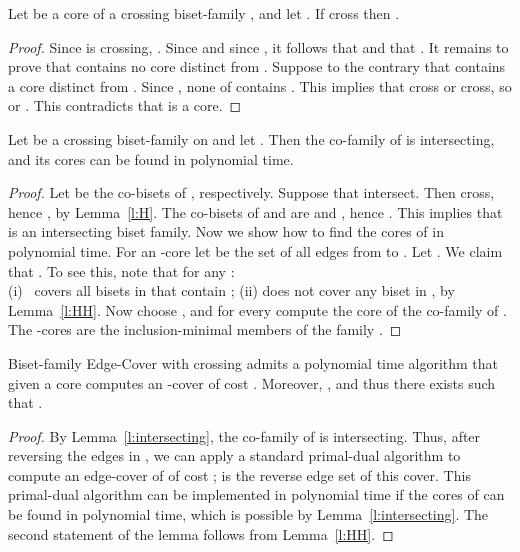 \begin{lemma} \label{l:H}
Let  be a core of a crossing biset-family , 
and let . 
If  cross then .
\end{lemma}
\begin{proof}
Since  is crossing, .
Since 
and since , it follows that 
and that .
It remains to prove that  contains no core distinct from .
Suppose to the contrary that  contains a core  distinct from .
Since , none of  contains .
This implies that  cross or  cross,
so  or .
This contradicts that  is a core.
\end{proof}

\begin{lemma} \label{l:intersecting}
Let  be a crossing biset-family on  and let .
Then the co-family 
of  is intersecting, and its cores can be found in polynomial time.
\end{lemma}
\begin{proof}
Let  be the co-bisets of ,
respectively. Suppose that  intersect.
Then  cross, hence ,
by Lemma~\ref{l:H}. The co-bisets of  and  are
 and ,
hence .
This implies that  is an intersecting biset family. 
Now we show how to find the cores of  in polynomial time.
For an -core  let 
 be the set of all edges 
from  to . 
Let . 
We claim that .
To see this, note that for any : \\ 
(i) \  covers all bisets in  that contain ; 
(ii)   does not cover any biset in , by Lemma~\ref{l:HH}. 
Now choose , and for every  compute the core  
of the co-family of . 
The -cores are the inclusion-minimal members of the family . 
\end{proof}

\begin{corollary} \label{c:S-greedy}
{\sf Biset-family Edge-Cover} with crossing 
admits a polynomial time algorithm that given a core  
computes an -cover  of cost 
.
Moreover, , and thus
there exists  such that .
\end{corollary}
\begin{proof}
By Lemma~\ref{l:intersecting}, the co-family 
 of  is intersecting.
Thus, after reversing the edges in , we can apply a standard primal-dual algorithm to compute an 
edge-cover of  of cost ; 
 is the reverse edge set of this cover.
This primal-dual algorithm can be implemented in polynomial time if the cores of 
can be found in polynomial time, which is possible by Lemma~\ref{l:intersecting}.
The second statement of the lemma follows from Lemma~\ref{l:HH}.
\end{proof}

